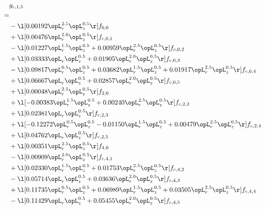 \begin{alignat}{2} 
\label{eq:g_15_0} 
& g_{c,1,5} \nonumber \\ 
 = \\ 
& - \l[  0.00192 \opL_r^{2.5} \opL_z^{0.5}  \r] f_{0,0} \nonumber \\ 
& + \l[  0.00476 \opL_r^{2.0} \opL_z^{0.5}  \r] f_{c,0,1} \nonumber \\ 
& - \l[  0.01227 \opL_r^{1.5} \opL_z^{0.5} +  0.00959 \opL_r^{2.5} \opL_z^{0.5}  \r] f_{c,0,2} \nonumber \\ 
& + \l[  0.03333 \opL_r \opL_z^{0.5} +  0.01905 \opL_r^{2.0} \opL_z^{0.5}  \r] f_{c,0,3} \nonumber \\ 
& - \l[  0.09817 \opL_r^{0.5} \opL_z^{0.5} +  0.03682 \opL_r^{1.5} \opL_z^{0.5} +  0.01917 \opL_r^{2.5} \opL_z^{0.5}  \r] f_{c,0,4} \nonumber \\ 
& + \l[  0.06667 \opL_r \opL_z^{0.5} +  0.02857 \opL_r^{2.0} \opL_z^{0.5}  \r] f_{c,0,5} \nonumber \\ 
& + \l[  0.00048 \opL_r^{2.5} \opL_z^{0.5}  \r] f_{2,0} \nonumber \\ 
& + \l[  -0.00383 \opL_r^{1.5} \opL_z^{0.5} +  0.00240 \opL_r^{2.5} \opL_z^{0.5}  \r] f_{c,2,2} \nonumber \\ 
& + \l[  0.02381 \opL_r \opL_z^{0.5}  \r] f_{c,2,3} \nonumber \\ 
& + \l[  -0.12272 \opL_r^{0.5} \opL_z^{0.5}   -0.01150 \opL_r^{1.5} \opL_z^{0.5} +  0.00479 \opL_r^{2.5} \opL_z^{0.5}  \r] f_{c,2,4} \nonumber \\ 
& + \l[  0.04762 \opL_r \opL_z^{0.5}  \r] f_{c,2,5} \nonumber \\ 
& + \l[  0.00351 \opL_r^{2.5} \opL_z^{0.5}  \r] f_{4,0} \nonumber \\ 
& - \l[  0.00909 \opL_r^{2.0} \opL_z^{0.5}  \r] f_{c,4,1} \nonumber \\ 
& + \l[  0.02330 \opL_r^{1.5} \opL_z^{0.5} +  0.01753 \opL_r^{2.5} \opL_z^{0.5}  \r] f_{c,4,2} \nonumber \\ 
& - \l[  0.05714 \opL_r \opL_z^{0.5} +  0.03636 \opL_r^{2.0} \opL_z^{0.5}  \r] f_{c,4,3} \nonumber \\ 
& + \l[  0.11735 \opL_r^{0.5} \opL_z^{0.5} +  0.06989 \opL_r^{1.5} \opL_z^{0.5} +  0.03505 \opL_r^{2.5} \opL_z^{0.5}  \r] f_{c,4,4} \nonumber \\ 
& - \l[  0.11429 \opL_r \opL_z^{0.5} +  0.05455 \opL_r^{2.0} \opL_z^{0.5}  \r] f_{c,4,5} \nonumber \\ 
\end{alignat} 


